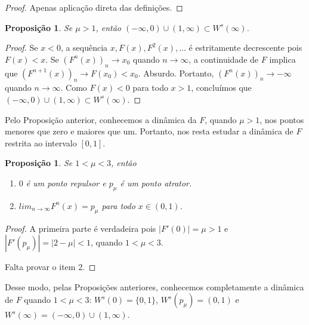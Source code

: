 \documentclass[a4paper, 12pt]{article}
\theoremstyle{definition}
\theoremstyle{plain}
\newtheorem{proposition}[definition]{Proposição}
\theoremstyle{plain}
\theoremstyle{plain}
\theoremstyle{remark}
\begin{document}
\begin{proof}
Apenas aplicação direta das definições.
\end{proof}

\begin{proposition}
\label{proposition 3 1}
Se $\mu > 1$, então $(-\infty, 0) \cup (1, \infty) \subset W^s(\infty)$.
\end{proposition}

\begin{proof}
Se $x < 0$, a sequência  $x, F(x), F^2(x), \dots$ é estritamente decrescente pois  $F(x) < x$. Se $(F^n(x))_n \longrightarrow x_0$ quando $n \longrightarrow \infty$, a continuidade de $F$ implica que $(F^{n+1}(x))_n \longrightarrow F (x_0) < x_0$. Absurdo. Portanto, $(F^n(x))_n \longrightarrow -\infty$ quando $n \longrightarrow \infty$. Como $F(x) < 0$ para todo $x > 1$, concluímos que $(-\infty, 0) \cup (1, \infty) \subset W^s(\infty)$.
\end{proof}

Pelo Proposição anterior, conhecemos a dinâmica da $F$, quando $\mu > 1$, nos pontos menores que zero e maiores que um. Portanto, nos resta estudar a dinâmica de $F$ restrita ao intervalo $[0, 1]$.

\begin{proposition}
Se $1 < \mu < 3$, então
\begin{enumerate}
\item $0$ é um ponto repulsor e $p_\mu$ é um ponto atrator.
\item $lim_{n \rightarrow \infty} F^n(x) = p_\mu$ para todo $x \in (0, 1)$.
\end{enumerate}
\end{proposition}

\begin{proof}
A primeira parte é verdadeira pois $|F'(0)| = \mu > 1$ e $|F'(p_\mu)| = |2 - \mu| < 1$, quando $1 < \mu < 3$.

Falta provar o item 2.
\end{proof}

Desse modo, pelas Proposições anteriores, conhecemos completamente a dinâmica de $F$ quando $1 < \mu < 3$: $W^s(0) = \{0, 1\}$, $W^s(p_\mu) = (0, 1)$ e $W^s(\infty) = (-\infty, 0) \cup (1, \infty)$.
\end{document}
